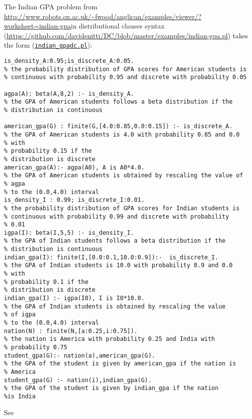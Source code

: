 The Indian GPA problem from \url{http://www.robots.ox.ac.uk/~fwood/anglican/examples/viewer/?worksheet=indian-gpa}in distributional clauses syntax  (\url{https://github.com/davidenitti/DC/blob/master/examples/indian-gpa.pl})
takes the form (\href{http://cplint.eu/example/inference/indian_gpadc.pl}{\texttt{indian\_gpadc.pl}}):
\begin{verbatim}
is_density_A:0.95;is_discrete_A:0.05.
% the probability distribution of GPA scores for American students is
% continuous with probability 0.95 and discrete with probability 0.05

agpa(A): beta(A,8,2) :- is_density_A.
% the GPA of American students follows a beta distribution if the
% distribution is continuous

american_gpa(G) : finite(G,[4.0:0.85,0.0:0.15]) :- is_discrete_A.
% the GPA of American students is 4.0 with probability 0.85 and 0.0
% with 
% probability 0.15 if the
% distribution is discrete
american_gpa(A):- agpa(A0), A is A0*4.0.
% the GPA of American students is obtained by rescaling the value of
% agpa
% to the (0.0,4.0) interval
is_density_I : 0.99; is_discrete_I:0.01.
% the probability distribution of GPA scores for Indian students is
% continuous with probability 0.99 and discrete with probability 
% 0.01
igpa(I): beta(I,5,5) :- is_density_I.
% the GPA of Indian students follows a beta distribution if the
% distribution is continuous
indian_gpa(I): finite(I,[0.0:0.1,10.0:0.9]):-  is_discrete_I.
% the GPA of Indian students is 10.0 with probability 0.9 and 0.0
% with
% probability 0.1 if the
% distribution is discrete
indian_gpa(I) :- igpa(I0), I is I0*10.0.
% the GPA of Indian students is obtained by rescaling the value 
% of igpa
% to the (0.0,4.0) interval
nation(N) : finite(N,[a:0.25,i:0.75]).
% the nation is America with probability 0.25 and India with 
% probability 0.75
student_gpa(G):- nation(a),american_gpa(G).
% the GPA of the student is given by american_gpa if the nation is 
% America
student_gpa(G) :- nation(i),indian_gpa(G).
% the GPA of the student is given by indian_gpa if the nation 
%is India
\end{verbatim}
See 
